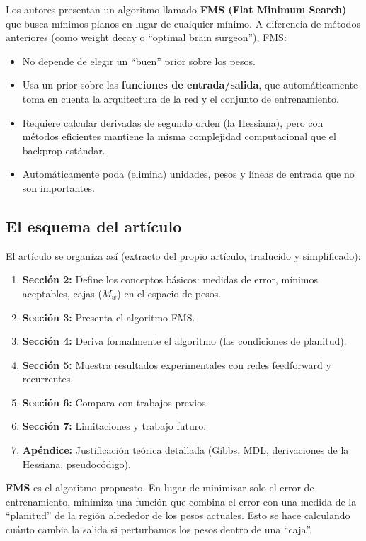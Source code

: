\documentclass[11pt,a4paper]{article}
\newcounter{definicion}
\newenvironment{definicion}[1][]{%
  \refstepcounter{definicion}%
  \begin{tcolorbox}[colback=grisclaro,colframe=verdecorado,title=Definición \thedefinicion: #1,breakable]}%
  {\end{tcolorbox}}
\begin{document}
Los autores presentan un algoritmo llamado \textbf{FMS (Flat Minimum Search)} que busca mínimos planos en lugar de cualquier mínimo. A diferencia de métodos anteriores (como weight decay o ``optimal brain surgeon''), FMS:

\begin{itemize}[leftmargin=2cm]
    \item No depende de elegir un ``buen'' prior sobre los pesos.
    \item Usa un prior sobre las \textbf{funciones de entrada/salida}, que automáticamente toma en cuenta la arquitectura de la red y el conjunto de entrenamiento.
    \item Requiere calcular derivadas de segundo orden (la Hessiana), pero con métodos eficientes mantiene la misma complejidad computacional que el backprop estándar.
    \item Automáticamente poda (elimina) unidades, pesos y líneas de entrada que no son importantes.
\end{itemize}

\subsection{El esquema del artículo}

El artículo se organiza así (extracto del propio artículo, traducido y simplificado):

\begin{enumerate}
    \item \textbf{Sección 2:} Define los conceptos básicos: medidas de error, mínimos aceptables, cajas ($M_w$) en el espacio de pesos.
    \item \textbf{Sección 3:} Presenta el algoritmo FMS.
    \item \textbf{Sección 4:} Deriva formalmente el algoritmo (las condiciones de planitud).
    \item \textbf{Sección 5:} Muestra resultados experimentales con redes feedforward y recurrentes.
    \item \textbf{Sección 6:} Compara con trabajos previos.
    \item \textbf{Sección 7:} Limitaciones y trabajo futuro.
    \item \textbf{Apéndice:} Justificación teórica detallada (Gibbs, MDL, derivaciones de la Hessiana, pseudocódigo).
\end{enumerate}

\begin{definicion}[Flat Minimum Search (FMS)]
\textbf{FMS} es el algoritmo propuesto. En lugar de minimizar solo el error de entrenamiento, minimiza una función que combina el error con una medida de la ``planitud'' de la región alrededor de los pesos actuales. Esto se hace calculando cuánto cambia la salida si perturbamos los pesos dentro de una ``caja''.
\end{definicion}
\end{document}
